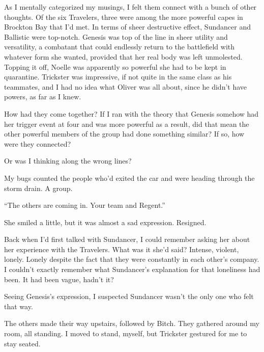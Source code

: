 As I mentally categorized my musings, I felt them connect with a bunch of other thoughts.  Of the six Travelers, three were among the more powerful capes in Brockton Bay that I'd met.  In terms of sheer destructive effect, Sundancer and Ballistic were top-notch.  Genesis was top of the line in sheer utility and versatility, a combatant that could endlessly return to the battlefield with whatever form she wanted, provided that her real body was left unmolested.  Topping it off, Noelle was apparently so powerful she had to be kept in quarantine.  Trickster was impressive, if not quite in the same class as his teammates, and I had no idea what Oliver was all about, since he didn't have powers, as far as I knew.



How had they come together?  If I ran with the theory that Genesis somehow had her trigger event at four and was more powerful as a result, did that mean the other powerful members of the group had done something similar?  If so, how were they connected?



Or was I thinking along the wrong lines?



My bugs counted the people who'd exited the car and were heading through the storm drain.  A group.



``The others are coming in.  Your team and Regent.''



She smiled a little, but it was almost a sad expression.  Resigned.



Back when I'd first talked with Sundancer, I could remember asking her about her experience with the Travelers.  What was it she'd said?  Intense, violent, lonely.  Lonely despite the fact that they were constantly in each other's company.  I couldn't exactly remember what Sundancer's explanation for that loneliness had been.  It had been vague, hadn't it?



Seeing Genesis's expression, I suspected Sundancer wasn't the only one who felt that way.



The others made their way upstairs, followed by Bitch.  They gathered around my room, all standing.  I moved to stand, myself, but Trickster gestured for me to stay seated.



